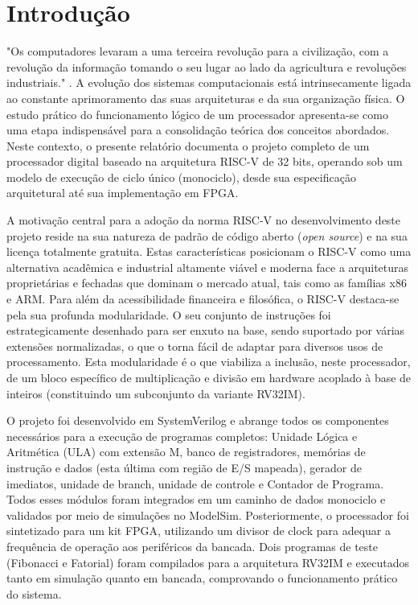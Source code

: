 \documentclass[
	12pt,				%
	oneside,
	a4paper,			%
	english,			%
	french,				%
	spanish,			%
	brazil,				%
	]{abntex2}
\begin{document}
\textual


\chapter{Introdução}

"Os computadores levaram a uma terceira revolução para a civilização, com a revolução da informação tomando o seu lugar ao lado da agricultura e revoluções industriais." \cite[p. 41, tradução própria]{pattersonriscv2018}. A evolução dos sistemas computacionais está intrinsecamente ligada ao constante aprimoramento das suas arquiteturas e da sua organização física. O estudo prático do funcionamento lógico de um processador apresenta-se como uma etapa indispensável para a consolidação teórica dos conceitos abordados. Neste contexto, o presente relatório documenta o projeto completo de um processador digital baseado na arquitetura RISC-V de 32 bits, operando sob um modelo de execução de ciclo único (monociclo), desde sua especificação arquitetural até sua implementação em FPGA.

A motivação central para a adoção da norma RISC-V no desenvolvimento deste projeto reside na sua natureza de padrão de código aberto (\textit{open source}) e na sua licença totalmente gratuita. Estas características posicionam o RISC-V como uma alternativa acadêmica e industrial altamente viável e moderna face a arquiteturas proprietárias e fechadas que dominam o mercado atual, tais como as famílias x86 e ARM. Para além da acessibilidade financeira e filosófica, o RISC-V destaca-se pela sua profunda modularidade. O seu conjunto de instruções foi estrategicamente desenhado para ser enxuto na base, sendo suportado por várias extensões normalizadas, o que o torna fácil de adaptar para diversos usos de processamento. Esta modularidade é o que viabiliza a inclusão, neste processador, de um bloco específico de multiplicação e divisão em hardware acoplado à base de inteiros (constituindo um subconjunto da variante RV32IM).

O projeto foi desenvolvido em SystemVerilog e abrange todos os componentes necessários para a execução de programas completos: Unidade Lógica e Aritmética (ULA) com extensão M, banco de registradores, memórias de instrução e dados (esta última com região de E/S mapeada), gerador de imediatos, unidade de branch, unidade de controle e Contador de Programa. Todos esses módulos foram integrados em um caminho de dados monociclo e validados por meio de simulações no ModelSim. Posteriormente, o processador foi sintetizado para um kit FPGA, utilizando um divisor de clock para adequar a frequência de operação aos periféricos da bancada. Dois programas de teste (Fibonacci e Fatorial) foram compilados para a arquitetura RV32IM e executados tanto em simulação quanto em bancada, comprovando o funcionamento prático do sistema.
\end{document}
